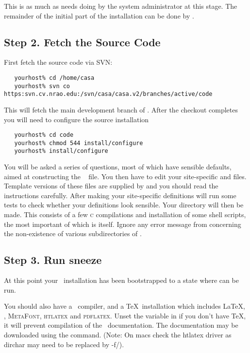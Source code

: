 This is as much as needs doing by the system administrator at this stage.  The
remainder of the initial part of the installation can be done by
.

\subsection*{Step 2. Fetch the Source Code}
\label{fetch source code}

First fetch the source code via SVN:

\begin{verbatim}
   yourhost% cd /home/casa
   yourhost% svn co https:svn.cv.nrao.edu:/svn/casa/casa.v2/branches/active/code 
\end{verbatim}

\noindent
This will fetch the main development branch of \casa. After the checkout completes you will
need to configure the source installation

\begin{verbatim}
   yourhost% cd code
   yourhost% chmod 544 install/configure
   yourhost% install/configure
\end{verbatim}

\noindent
You will be asked a series of questions, most of which have sensible defaults,
aimed at constructing the \aipspp\  file.  You then have to
edit your site-specific  and  files.  Template
versions of these files are supplied by  and you should read
the instructions carefully.  After making your site-specific definitions
 will run some tests to check whether your 
definitions look sensible.  Your  directory will then be made.
This consists of a few \textsc{c} compilations and installation of some shell
scripts, the most important of which is  itself.  Ignore any
error message from  concerning the non-existence of various
subdirectories of .

\subsection*{Step 3. Run sneeze}

At this point your \aipspp\ installation has been bootstrapped to a state
where  can be run.

You should also have a \cplusplus\ compiler, and a \TeX\ installation which
includes \LaTeX, , \textsc{MetaFont}, \textsc{htlatex} and \textsc{pdflatex}.
Unset the  variable in  if you
don't have \TeX, it will prevent compilation of the \aipspp\ documentation.
The documentation may be downloaded using the  command.
(Note: On macs check the htlatex driver as \\dirchar may need to be replaced by -f/).

